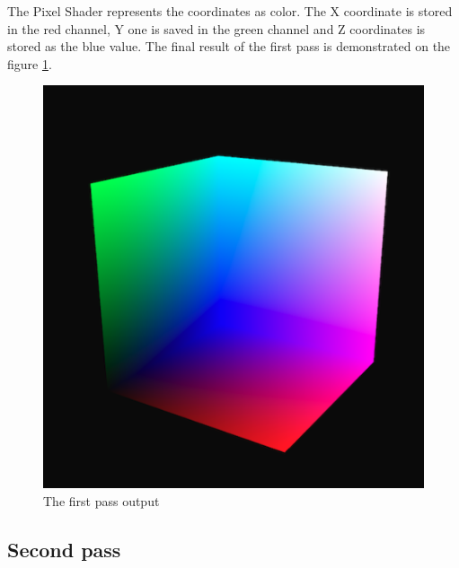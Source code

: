 \documentclass[twoside, english, 11pt]{report}
\begin{document}
The Pixel Shader represents the coordinates as color. The X coordinate is stored in the red channel, Y one is saved in the green channel and Z coordinates is stored as the blue value. The final result of the first pass is demonstrated on the figure \ref{fig:first}.
\begin{figure}[!h]
\centerline{\includegraphics[scale = 0.45]{img/first}}
\caption{The first pass output\label{fig:first}}
\end{figure}

\subsection{Second pass}
\end{document}
